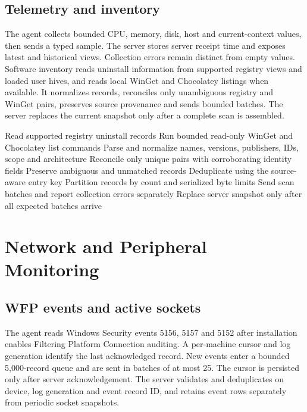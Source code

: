 \documentclass[12pt,a4paper]{report}
\begin{document}
\subsection{Telemetry and inventory}
The agent collects bounded CPU, memory, disk, host and current-context values,
then sends a typed sample. The server stores server receipt time and exposes
latest and historical views. Collection errors remain distinct from empty
values. Software inventory reads uninstall information from supported registry
views and loaded user hives, and reads local WinGet and Chocolatey listings
when available. It normalizes records, reconciles only unambiguous registry and
WinGet pairs, preserves source provenance and sends bounded batches. The server
replaces the current snapshot only after a complete scan is assembled.

\begin{algorithm}[H]
\caption{Software inventory collection}
\label{alg:inventory}
\begin{algorithmic}[1]
\State Read supported registry uninstall records
\State Run bounded read-only WinGet and Chocolatey list commands
\State Parse and normalize names, versions, publishers, IDs, scope and architecture
\State Reconcile only unique pairs with corroborating identity fields
\State Preserve ambiguous and unmatched records
\State Deduplicate using the source-aware entry key
\State Partition records by count and serialized byte limits
\State Send scan batches and report collection errors separately
\State Replace server snapshot only after all expected batches arrive
\end{algorithmic}
\end{algorithm}

\section{Network and Peripheral Monitoring}

\subsection{WFP events and active sockets}
The agent reads Windows Security events 5156, 5157 and 5152 after installation
enables Filtering Platform Connection auditing. A per-machine cursor and log
generation identify the last acknowledged record. New events enter a bounded
5,000-record queue and are sent in batches of at most 25. The cursor is
persisted only after server acknowledgement. The server validates and
deduplicates on device, log generation and event record ID, and retains event
rows separately from periodic socket snapshots.
\end{document}
